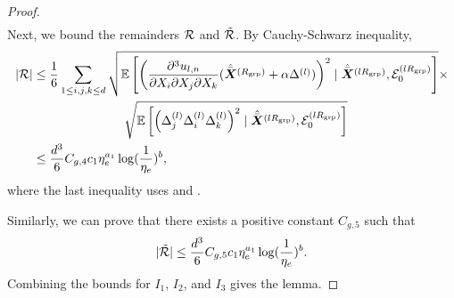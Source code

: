 \begin{proof}
\begin{align*}
    \end{align*}
    Next, we bound the remainders $\mathcal{R}$ and $\tilde{\mathcal{R}}$. By Cauchy-Schwarz inequality, 
    \begin{align*}
        |\mathcal{R}| &\le \frac{1}{6} \sum_{1\le i,j,k \le d} \sqrt{\mathbb{E}\left[\left(\frac{\partial^3 u_{l,n}}{\partial X_i\partial X_j\partial X_k}(\hat{\bar{{\bm{X}}}}^{(R_{\mathrm{grp}})} + \alpha\Delta^{(l)})\right)^2\mid \hat{\bar{{\bm{X}}}}^{(lR_{\mathrm{grp}})},\mathcal{E}_0^{(lR_{\mathrm{grp}})}\right]}\times\\  &~~~~~~~~~~~~~~~~~~~~~~\sqrt{\mathbb{E}\left[\left(\Delta_j^{(l)}\Delta_i^{(l)}\Delta_k^{(l)}\right)^2\mid \hat{\bar{{\bm{X}}}}^{(lR_{\mathrm{grp}})},\mathcal{E}_0^{(lR_{\mathrm{grp}})}\right]}\\
        &\le\frac{d^3}{6}C_{g,4}c_1\eta_e^{a_1}\log(\frac{1}{\eta_e})^b,
    \end{align*}
    where the last inequality uses  and .

    Similarly, we can prove that there exists a positive constant $C_{g,5}$ such that 
    \begin{align*}
        |\tilde{\mathcal{R}}| \le \frac{d^3}{6}C_{g,5}c_1\eta_e^{a_1}\log(\frac{1}{\eta_e})^b.
    \end{align*}
    Combining the bounds for $I_1$, $I_2$, and $I_3$ gives the lemma.
\end{proof}
